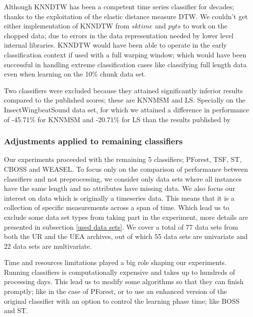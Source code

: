 Although KNNDTW has been a competent time series classifier for decades; thanks to the exploitation of the elastic distance measure DTW.
We couldn't get either implementation of KNNDTW from $sktime$ and $pyts$ to work on the chopped data; due to errors in the data representation needed by lower level internal libraries.
KNNDTW would have been able to operate in the early classification context if used with a full warping window; which would have been successful in handling extreme classification cases like classifying full length data
even when learning on the 10\% chunk data set.


Two classifiers were excluded because they attained significantly inferior results compared to the published scores; these are KNNMSM and LS.
Specially on the InsectWingbeatSound data set, for which we attained a difference in performance of -45.71\% for KNNMSM and -20.71\% for LS than the results published by \cite{bagnall2017great}

\subsubsection{Adjustments applied to remaining classifiers}
\label{SubsectionIncludedClassifiers}
Our experiments proceeded with the remaining 5 classifiers; PForest, TSF, ST, CBOSS and WEASEL.
To focus only on the comparison of performance between classifiers and not preprocessing, we consider only data sets where all instances have the same length and no attributes have missing data.
We also focus our interest on data which is originally a timeseries data. This means that it is a collection of specific measurements across a span of time.
Which lead us to exclude some data set types from taking part in the experiment, more details are presented in subsection \ref{used data sets}.
We cover a total of 77 data sets from both the UR and the UEA archives, out of which 55 data sets are univariate and 22 data sets are multivariate.

Time and resources limitations played a big role shaping our experiments. Running classifiers is computationally expensive \cite{schafer2020teaser}
and takes up to hundreds of processing days.
This lead us to modify some algorithms so that they can finish promptly; like in the case of PForest, or to use an enhanced version of the original
classifier with an option to control the learning phase time; like BOSS and ST.

